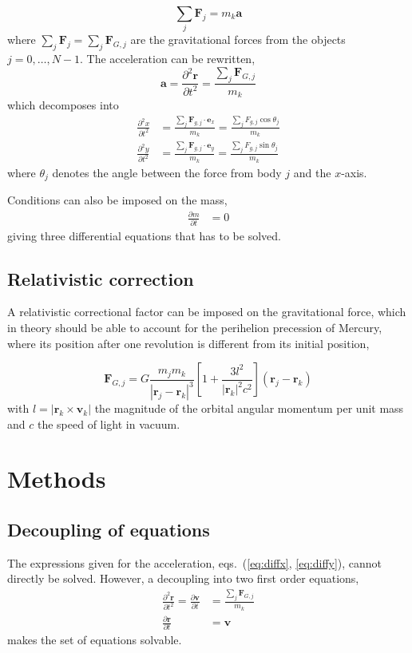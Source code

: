 \documentclass[a4paper,11pt]{article}
\begin{document}
\begin{equation}
    \sum_j \mathbf{F}_j = m_k \mathbf{a}
    \label{eq:N2L}
\end{equation}
where $\sum_j \mathbf{F}_j = \sum_j \mathbf{F}_{G,j}$ are the gravitational forces from the objects $j=0,\dots,N-1$. The acceleration can be rewritten,
\[ \mathbf{a} = \frac{\partial^2 \mathbf{r}}{\partial t^2} = \frac{\sum_j \mathbf{F}_{G,j}}{m_k} \]
which decomposes into
\begin{align}
    \frac{\partial^2 x}{\partial t^2} &= \frac{\sum_j \mathbf{F}_{g,j} \cdot \mathbf{e}_x}{m_k} = \frac{\sum_j F_{g,j} \cos \theta_j}{m_k} 
    \label{eq:diffx} \\
    \frac{\partial^2 y}{\partial t^2} &= \frac{\sum_j \mathbf{F}_{g,j} \cdot \mathbf{e}_y}{m_k} = \frac{\sum_j F_{g,j} \sin \theta_j }{m_k}
    \label{eq:diffy}
\end{align}
where $\theta_j$ denotes the angle between the force from body $j$ and the $x$-axis.

Conditions can also be imposed on the mass,
\begin{align}
    \frac{\partial m}{\partial t} &= 0 \label{eq:diffm} 
\end{align}
giving three differential equations that has to be solved. 

\subsection{Relativistic correction}
A relativistic correctional factor can be imposed on the gravitational force, which in theory should be able to account for the perihelion precession of Mercury, where its position after one revolution is different from its initial position,

\begin{equation}
    \mathbf{F}_{G,j} = G\frac{m_j m_k}{| \mathbf{r}_j - \mathbf{r}_k |^3} \left[ 1 + \frac{3l^2}{|\mathbf{r}_k |^2 c^2} \right] \left( \mathbf{r}_j - \mathbf{r}_k \right)
    \label{eq:perihelion}
\end{equation}
with $l = |\mathbf{r}_k \times \mathbf{v}_k|$ the magnitude of the orbital angular momentum per unit mass and $c$ the speed of light in vacuum.


\section{Methods}
\subsection{Decoupling of equations}
The expressions given for the acceleration, eqs.~(\ref{eq:diffx}, \ref{eq:diffy}), cannot directly be solved. However, a decoupling into two first order equations,
\begin{align}
    \frac{\partial^2 \mathbf{r}}{\partial t^2} = \frac{\partial \mathbf{v}}{\partial t} &= \frac{\sum_j \mathbf{F}_{G,j}}{m_k} \label{eq:velocity} \\
    \frac{\partial \mathbf{r}}{\partial t} &= \mathbf{v} \label{eq:position}
\end{align}
makes the set of equations solvable.
\end{document}
